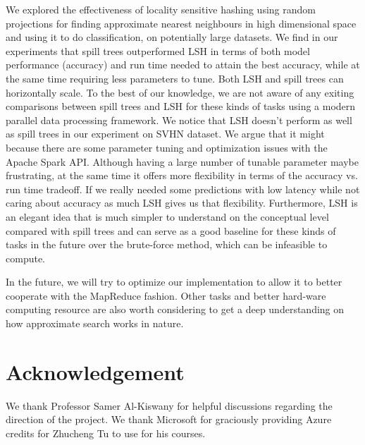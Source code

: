 \documentclass[letterpaper,twocolumn,10pt]{article}
\theoremstyle{definition}
\begin{document}
We explored the effectiveness of locality sensitive hashing using random projections for finding 
approximate nearest neighbours in high dimensional space and using it to do classification, on 
potentially large datasets. We find in our experiments that spill trees outperformed LSH in terms of 
both model performance (accuracy) and run time needed to attain the best accuracy, while at the same 
time requiring less parameters to tune. Both LSH and spill trees can horizontally scale. To the best of 
our knowledge, we are not aware of any exiting comparisons between spill trees and LSH for these 
kinds of tasks using a modern parallel data processing framework. 
We notice that LSH doesn't 
perform as well as spill trees in our experiment on SVHN dataset. 
We argue that it might because there are some parameter tuning and optimization issues with the Apache Spark API. 
Although having a large 
number of tunable parameter maybe frustrating, at the same time it offers more flexibility in terms of 
the accuracy vs. run time tradeoff. If we really needed some predictions with low latency while not 
caring about accuracy as much LSH gives us that flexibility. Furthermore, LSH is an elegant idea that is 
much simpler to understand on the conceptual level compared with spill trees and can serve as a good 
baseline for these kinds of tasks in the future over the brute-force method, which can be infeasible to 
compute.

In the future, we will try to optimize our implementation to allow it to better cooperate with the MapReduce fashion. Other tasks and better hard-ware computing resource are also worth considering to get a deep understanding on how approximate search works in nature.

\section*{Acknowledgement}
We thank Professor Samer Al-Kiswany for helpful discussions regarding the direction 
of the project. We thank Microsoft for graciously providing Azure credits for 
Zhucheng Tu to use for his courses.
{\footnotesize 
}
\end{document}
